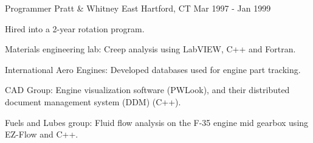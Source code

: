 \begin{cventries}
\cventry
    {Programmer} %
    {Pratt \& Whitney} %
    {East Hartford, CT} %
    {Mar 1997 - Jan 1999} %
    {
      \begin{cvitems} %
        \item {Hired into a 2-year rotation program.}
        \item {Materials engineering lab: Creep analysis using LabVIEW, C++ and Fortran.}
         \item {International Aero Engines: Developed databases used for engine part tracking.}
         \item {CAD Group: Engine visualization software (PWLook), and their distributed document management system (DDM) (C++).}
         \item {Fuels and Lubes group: Fluid flow analysis on the F-35 engine mid gearbox using EZ-Flow and C++.}
      \end{cvitems}
    }
    

\end{cventries}
